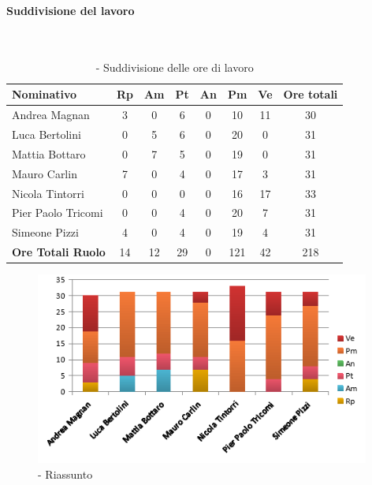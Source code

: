 \documentclass[./PianoDiProgetto.tex]{subfiles}
\begin{document}
	\subsubsection{\PerC}
				\paragraph{Suddivisione del lavoro}\

	\begin{table}[H]
		\begin{tabularx}{\textwidth}{l  * {6}{c}  c}
			\toprule
			\textbf{Nominativo} & \textbf{Rp} & \textbf{Am} & \textbf{Pt}
						& \textbf{An} & \textbf{Pm} & \textbf{Ve} & \textbf{Ore totali} \\
			\midrule
			Andrea Magnan  & 3 & 0 & 6 & 0 & 10 & 11 & 30 \\
			Luca Bertolini  & 0 & 5 & 6 & 0 & 20 & 0 & 31 \\
			Mattia Bottaro  & 0 & 7 & 5 & 0 & 19 & 0 & 31 \\
			Mauro Carlin  & 7 & 0 & 4 & 0 & 17 & 3 & 31 \\
			Nicola Tintorri  & 0 & 0 & 0 & 0 & 16 & 17 & 33 \\
			Pier Paolo Tricomi  & 0 & 0 & 4 & 0 & 20 & 7 & 31 \\
			Simeone Pizzi & 4 & 0 & 4 & 0 & 19 & 4 & 31 \\
			\midrule
			\textbf{Ore Totali Ruolo} & 14 & 12 & 29 & 0 & 121 & 42 & 218 \\
			\bottomrule

		\end{tabularx}
		\caption{\PerC{} - Suddivisione delle ore di lavoro}
	\end{table}

\vfill

	\begin{figure}[H]
		\centering
		\includegraphics[width=11cm, trim=1cm 0cm 1cm 0cm]{grafici/C-persona}
			\caption{\PerC{}- Riassunto}
	\end{figure}
\vfill
\end{document}
